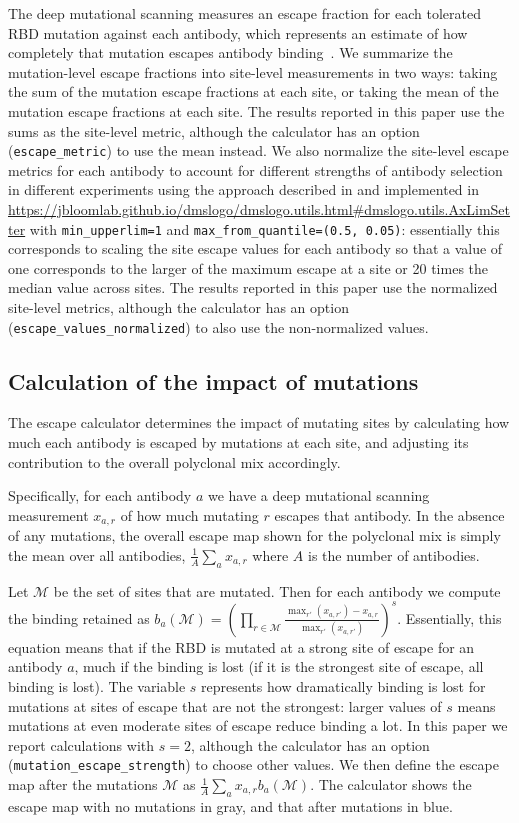 \documentclass[9pt,twocolumn,twoside]{gsajnl_modified}
\begin{document}
{The deep mutational scanning measures an escape fraction for each tolerated RBD mutation against each antibody, which represents an estimate of how completely that mutation escapes antibody binding~\citep{greaney2021complete}.
We summarize the mutation-level escape fractions into site-level measurements in two ways: taking the sum of the mutation escape fractions at each site, or taking the mean of the mutation escape fractions at each site.
The results reported in this paper use the sums as the site-level metric, although the calculator has an option (\texttt{escape\_metric}) to use the mean instead.
We also normalize the site-level escape metrics for each antibody to account for different strengths of antibody selection in different experiments using the approach described in \citet{greaney2021comprehensive} and implemented in \url{https://jbloomlab.github.io/dmslogo/dmslogo.utils.html#dmslogo.utils.AxLimSetter} with \texttt{min\_upperlim=1} and \texttt{max\_from\_quantile=(0.5, 0.05)}: essentially this corresponds to scaling the site escape values for each antibody so that a value of one corresponds to the larger of the maximum escape at a site or 20 times the median value across sites.
The results reported in this paper use the normalized site-level metrics, although the calculator has an option (\texttt{escape\_values\_normalized}) to also use the non-normalized values.

\subsection{Calculation of the impact of mutations}
The escape calculator determines the impact of mutating sites by calculating how much each antibody is escaped by mutations at each site, and adjusting its contribution to the overall polyclonal mix accordingly.

Specifically, for each antibody $a$ we have a deep mutational scanning measurement $x_{a,r}$ of how much mutating $r$ escapes that antibody.
In the absence of any mutations, the overall escape map shown for the polyclonal mix is simply the mean over all antibodies, $\frac{1}{A}\sum_a x_{a,r}$ where $A$ is the number of antibodies.

Let $\mathcal{M}$ be the set of sites that are mutated.
Then for each antibody we compute the binding retained as $b_a\left(\mathcal{M}\right) = \left(\prod\limits_{r \in \mathcal{M}} \frac{\max_{r'}\left(x_{a,r'}\right) - x_{a,r}}{\max_{r'}\left(x_{a,r'}\right)}\right)^s$. 
Essentially, this equation means that if the RBD is mutated at a strong site of escape for an antibody $a$, much if the binding is lost (if it is the strongest site of escape, all binding is lost).
The variable $s$ represents how dramatically binding is lost for mutations at sites of escape that are not the strongest: larger values of $s$ means mutations at even moderate sites of escape reduce binding a lot.
In this paper we report calculations with $s = 2$, although the calculator has an option (\texttt{mutation\_escape\_strength}) to choose other values.
We then define the escape map after the mutations $\mathcal{M}$ as $\frac{1}{A}\sum_a x_{a,r} b_a\left(\mathcal{M}\right)$.
The calculator shows the escape map with no mutations in gray, and that after mutations in blue.

}
\end{document}
